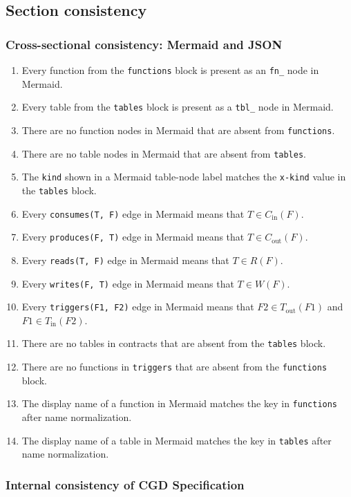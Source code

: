 \subsection{Section consistency}

\subsubsection{Cross-sectional consistency: Mermaid and JSON}

\begin{enumerate}
\item Every function from the \texttt{functions} block is present as an \texttt{fn\_} node in Mermaid.
\item Every table from the \texttt{tables} block is present as a \texttt{tbl\_} node in Mermaid.
\item There are no function nodes in Mermaid that are absent from \texttt{functions}.
\item There are no table nodes in Mermaid that are absent from \texttt{tables}.
\item The \texttt{kind} shown in a Mermaid table-node label matches the \texttt{x-kind} value in the \texttt{tables} block.
\item Every \texttt{consumes(T, F)} edge in Mermaid means that $T \in C_{\mathrm{in}}(F)$.
\item Every \texttt{produces(F, T)} edge in Mermaid means that $T \in C_{\mathrm{out}}(F)$.
\item Every \texttt{reads(T, F)} edge in Mermaid means that $T \in R(F)$.
\item Every \texttt{writes(F, T)} edge in Mermaid means that $T \in W(F)$.
\item Every \texttt{triggers(F1, F2)} edge in Mermaid means that $F2 \in T_{\mathrm{out}}(F1)$ and $F1 \in T_{\mathrm{in}}(F2)$.
\item There are no tables in contracts that are absent from the \texttt{tables} block.
\item There are no functions in \texttt{triggers} that are absent from the \texttt{functions} block.
\item The display name of a function in Mermaid matches the key in \texttt{functions} after name normalization.
\item The display name of a table in Mermaid matches the key in \texttt{tables} after name normalization.
\end{enumerate}

\subsubsection{Internal consistency of CGD Specification}

